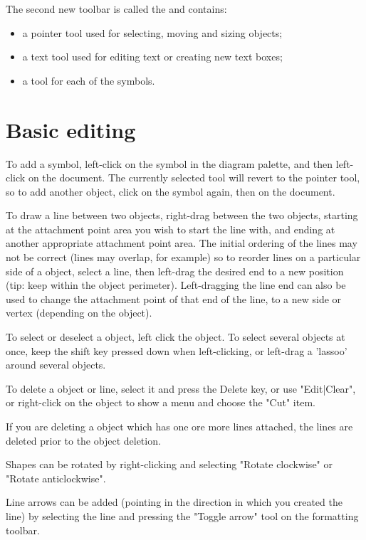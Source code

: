 The second new toolbar is called the  and contains:

\begin{itemize}\itemsep=0pt
\item a pointer tool used for selecting, moving and sizing objects;
\item a text tool used for editing text or creating new text boxes;
\item a tool for each of the symbols.
\end{itemize}

\section{Basic editing}

To add a symbol, left-click on the symbol in the diagram palette,
and then left-click on the document. The currently selected
tool will revert to the pointer tool, so to add another object,
click on the symbol again, then on the document.

To draw a line between two objects, right-drag between the two
objects, starting at the attachment point area you wish to start the
line with, and ending at another appropriate attachment point
area. The initial ordering of the lines may not be correct (lines
may overlap, for example) so to reorder lines on a particular
side of a object, select a line, then left-drag the desired end to a new
position (tip: keep within the object perimeter). Left-dragging the
line end can also be used to change the attachment point of that
end of the line, to a new side or vertex (depending on the object).

To select or deselect a object, left click the object. To select
several objects at once, keep the shift key pressed down when
left-clicking, or left-drag a 'lassoo' around several objects.

To delete a object or line, select it and press the Delete key, or use
"Edit|Clear", or right-click on the object to show a menu and choose
the "Cut" item.

If you are deleting a object which has one ore more lines
attached, the lines are deleted prior to the object deletion.

Shapes can be rotated by right-clicking and selecting "Rotate
clockwise" or "Rotate anticlockwise".

Line arrows can be added (pointing in the direction in which
you created the line) by selecting the line and pressing the
"Toggle arrow" tool on the formatting toolbar.

